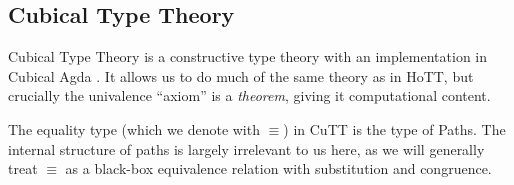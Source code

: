 \subsection{Cubical Type Theory}
Cubical Type Theory \cite{cohenCubicalTypeTheory2016} is a constructive type
theory with an implementation in Cubical Agda
\cite{vezzosiCubicalAgdaDependently2019}.
It allows us to do much of the same theory as in HoTT, but crucially the
univalence ``axiom'' is a \emph{theorem}, giving it computational content.
\begin{definition} \label{path-types}
  The equality type (which we denote with \(\equiv\)) in CuTT is the type of
  Paths\footnotemark.
  The internal structure of paths is largely irrelevant to us here, as we will
  generally treat \(\equiv\) as a black-box equivalence relation with
  substitution and congruence.
\end{definition}


